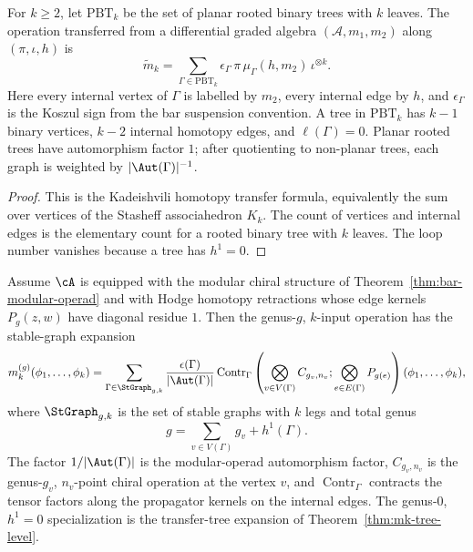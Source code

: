 \begin{theorem}
\label{thm:mk-tree-level}
For \(k\geq 2\), let \(\mathrm{PBT}_k\) be the set of planar rooted
binary trees with \(k\) leaves.  The operation transferred from a
differential graded algebra \((\mathcal A,m_1,m_2)\) along
\((\pi,\iota,h)\) is
\[
\widetilde m_k
=\sum_{\Gamma\in\mathrm{PBT}_k}
\epsilon_\Gamma\,\pi\,\mu_\Gamma(h,m_2)\,\iota^{\otimes k}.
\]
Here every internal vertex of \(\Gamma\) is labelled by \(m_2\), every
internal edge by \(h\), and \(\epsilon_\Gamma\) is the Koszul sign
from the bar suspension convention.  A tree in \(\mathrm{PBT}_k\) has
\(k-1\) binary vertices, \(k-2\) internal homotopy edges, and
\(\ell(\Gamma)=0\).  Planar rooted trees have automorphism factor \(1\);
after quotienting to non-planar trees, each graph is weighted by
\(|\Aut(\Gamma)|^{-1}\).
\end{theorem}

\begin{proof}
This is the Kadeishvili homotopy transfer formula, equivalently the
sum over vertices of the Stasheff associahedron \(K_k\).  The count of
vertices and internal edges is the elementary count for a rooted
binary tree with \(k\) leaves.  The loop number vanishes because a tree
has \(h^1=0\).
\end{proof}

\begin{theorem}
\label{thm:mk-general-structure}
Assume \(\cA\) is equipped with the modular chiral structure of
Theorem~\ref{thm:bar-modular-operad} and with Hodge homotopy
retractions whose edge kernels \(P_g(z,w)\) have diagonal residue
\(1\).  Then the genus-\(g\), \(k\)-input operation has the stable-graph
expansion
\[
m_k^{(g)}(\phi_1,\ldots,\phi_k)
=
\sum_{\Gamma\in \StGraph_{g,k}}
\frac{\epsilon(\Gamma)}{|\Aut(\Gamma)|}
\operatorname{Contr}_\Gamma
\left(
\bigotimes_{v\in V(\Gamma)} C_{g_v,n_v};
\bigotimes_{e\in E(\Gamma)}P_{g(e)}
\right)(\phi_1,\ldots,\phi_k),
\]
where \(\StGraph_{g,k}\) is the set of stable graphs with \(k\) legs
and total genus
\[
g=\sum_{v\in V(\Gamma)}g_v+h^1(\Gamma).
\]
The factor \(1/|\Aut(\Gamma)|\) is the modular-operad automorphism
factor, \(C_{g_v,n_v}\) is the genus-\(g_v\), \(n_v\)-point chiral
operation at the vertex \(v\), and \(\operatorname{Contr}_\Gamma\)
contracts the tensor factors along the propagator kernels on the
internal edges.  The genus-\(0\), \(h^1=0\) specialization is the
transfer-tree expansion of Theorem~\ref{thm:mk-tree-level}.
\end{theorem}

